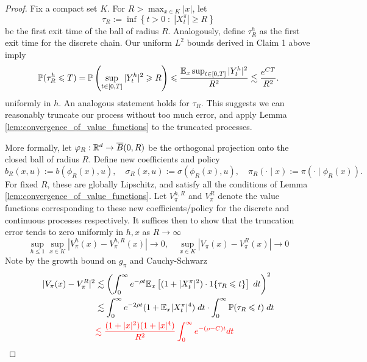 \begin{proof}
	Fix a compact set $K$. For $R > \max_{x \in K} |x|$, let
	\[\tau_R := \inf \left\{t > 0 \; : \; |X_t^\pi| \geq R\right\}\]
	\noindent be the first exit time of the ball of radius $R$. Analogously, define $\tau_R^h$ as the first
	exit time for the discrete chain. Our uniform $L^2$ bounds derived in Claim 1 above imply
	\[\mathbb{P}(\tau_R^h \leqslant T) = \mathbb{P}\left(\sup_{t \in [0,T]} |Y_t^h|^2 \geqslant R\right) \leqslant \frac{\mathbb{E}_x \sup_{t \in [0,T]} |Y_t^h|^2}{R^2} \lesssim\frac{e^{CT}}{R^2}. \]
	\noindent uniformly in $h$. An analogous statement holds for $\tau_R$.  This suggests we can reasonably truncate
	our process without too much error, and apply Lemma \ref{lem:convergence_of_value_functions} to the truncated processes.

	More formally, let $\varphi_R: \mathbb{R}^d \to \overline{B}(0, R)$ be the orthogonal projection onto the closed ball of radius $R$. Define new coefficients and policy
	\[b_R(x, u) := b(\phi_R(x), u), \quad \sigma_R(x, u) := \sigma(\phi_R(x), u), \quad \pi_R(\cdot \mid x) := \pi( \cdot \mid \phi_R(x)).\]
	\noindent For fixed $R$, these are globally Lipschitz, and satisfy all the conditions of Lemma \ref{lem:convergence_of_value_functions}. Let $V_\pi^{h, R}$ and $V_\pi^R$ denote the
	value functions corresponding to these new coefficients/policy for the discrete and continuous processes respectively. It suffices then to show that the truncation error tends to zero uniformly in $h, x$ as $R \to \infty$
	\[\sup_{h \leq 1} \sup_{x \in K} |V_\pi^h(x) - V_\pi^{h,R}(x)| \to 0, \quad  \sup_{x \in K} |V_\pi(x) - V_\pi^{R}(x)| \to 0\]
	\noindent Note by the growth bound on $g_\pi$ and Cauchy-Schwarz
	\begin{align*}
		|V_\pi(x) - V_\pi^R|^2 & \lesssim \left(\int_0^\infty e^{-\rho t} \mathbb{E}_x \left[(1 + |X_t^\pi|^2) \cdot 1\{\tau_R \leqslant t\} \right]\; dt \right)^2 \\
		& \lesssim \int_0^\infty e^{-2\rho t} (1 + \mathbb{E}_x|X_t^\pi|^4) \;dt \cdot\int_0^\infty \mathbb{P}(\tau_R \leqslant t) \; dt\\
		& \textcolor{red}{\lesssim \frac{(1 + |x|^2)(1 + |x|^4)}{R^2} \int_0^\infty e^{-(\rho - C)t} dt}
	\end{align*}
\end{proof}



